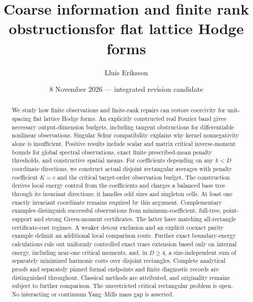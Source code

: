 \documentclass[11pt]{article}
\title{Coarse information and finite rank obstructions\newline for flat lattice Hodge forms}
\author{Lluis Eriksson}
\date{8 November 2026 --- integrated revision candidate}
\begin{document}
\maketitle
\begin{abstract}
We study how finite observations and finite-rank repairs can restore coercivity
for unit-spacing flat lattice Hodge forms. An explicitly constructed real Fourier
band gives necessary output-dimension budgets, including tangent obstructions
for differentiable nonlinear observations. Singular Schur compatibility explains
why kernel nonnegativity alone is insufficient. Positive results include scalar
and matrix critical inverse-moment bounds for global spectral observations,
exact finite prescribed-mean penalty thresholds, and constructive spatial means.
For coefficients depending on any $k<D$ coordinate directions, we construct
actual disjoint rectangular averages with penalty coefficient $K=c$ and the
critical target-order observation budget. The construction derives local energy
control from the coefficients and charges a balanced base tree through its
invariant directions; it handles odd sizes and singleton cells. At least one
exactly invariant coordinate remains required by this argument. Complementary
examples distinguish successful observations from minimum-coefficient, full-tree,
point-support and strong Green-moment certificates. The latter have matching
all-rectangle certificate-cost regimes. A weaker detour exclusion and an explicit
coexact parity example delimit an additional local comparison route.
Further exact boundary-energy calculations rule out uniformly controlled
exact trace extension based only on internal energy, including near-one
critical moments, and, in $D\ge4$, a size-independent
sum of separately minimized harmonic costs over disjoint rectangles.
Complete analytical proofs and separately
pinned formal endpoints and finite diagnostic records are distinguished
throughout. Classical methods are attributed, and originality remains subject
to further comparison. The unrestricted critical rectangular problem is open.
No interacting or continuum Yang--Mills mass gap is asserted.
\end{abstract}
\clearpage
\end{document}
